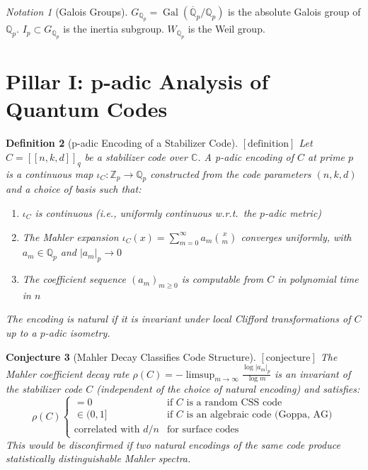 \documentclass[12pt]{article}
\newtheorem{definition}{Definition}[section]
\newtheorem{conjecture}[definition]{Conjecture}
\theoremstyle{remark}
\newtheorem{notation}[definition]{Notation}
\begin{document}
\begin{notation}[Galois Groups]
$G_{\mathbb{Q}_p} = \operatorname{Gal}(\overline{\mathbb{Q}}_p / \mathbb{Q}_p)$
is the absolute Galois group of $\mathbb{Q}_p$. $I_p \subset G_{\mathbb{Q}_p}$
is the inertia subgroup. $W_{\mathbb{Q}_p}$ is the Weil group.
\end{notation}

\section{Pillar I: p-adic Analysis of Quantum Codes}

\begin{definition}[p-adic Encoding of a Stabilizer Code]
$[\text{definition}]$
Let $C = [[n,k,d]]_q$ be a stabilizer code over $\mathbb{C}$. A
\emph{p-adic encoding} of $C$ at prime $p$ is a continuous map
$\iota_C: \mathbb{Z}_p \to \mathbb{Q}_p$ constructed from the code
parameters $(n,k,d)$ and a choice of basis such that:
\begin{enumerate}
\item $\iota_C$ is continuous (i.e., uniformly continuous w.r.t.\ the
  $p$-adic metric)
\item The Mahler expansion $\iota_C(x) = \sum_{m=0}^{\infty} a_m \binom{x}{m}$
  converges uniformly, with $a_m \in \mathbb{Q}_p$ and $|a_m|_p \to 0$
\item The coefficient sequence $(a_m)_{m \geq 0}$ is computable from $C$
  in polynomial time in $n$
\end{enumerate}
The encoding is \emph{natural} if it is invariant under local Clifford
transformations of $C$ up to a $p$-adic isometry.
\end{definition}

\begin{conjecture}[Mahler Decay Classifies Code Structure]
$[\text{conjecture}]$
The Mahler coefficient decay rate $\rho(C) = -\limsup_{m \to \infty}
\frac{\log |a_m|_p}{\log m}$ is an invariant of the stabilizer code $C$
(independent of the choice of natural encoding) and satisfies:
\[
\rho(C) \begin{cases}
= 0 & \text{if } C \text{ is a random CSS code} \\
\in (0, 1] & \text{if } C \text{ is an algebraic code (Goppa, AG)} \\
\text{correlated with } d/n & \text{for surface codes}
\end{cases}
\]
This would be disconfirmed if two natural encodings of the same code produce
statistically distinguishable Mahler spectra.
\end{conjecture}
\end{document}
